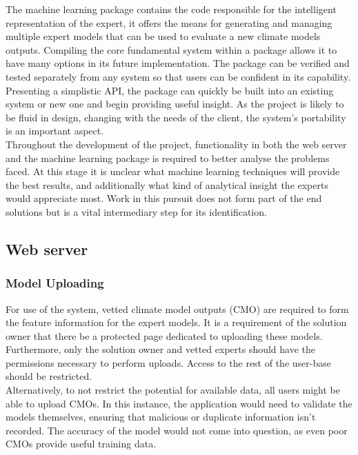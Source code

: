 \documentclass{ecmm427_assignment}
\begin{document}
\quad The machine learning package contains the code responsible for the intelligent representation of the expert, it offers the means for generating and managing multiple expert models that can be used to evaluate a new climate models outputs. Compiling the core fundamental system within a package allows it to have many options in its future implementation. The package can be verified and tested separately from any system so that users can be confident in its capability. Presenting a simplistic API, the package can quickly be built into an existing system or new one and begin providing useful insight. As the project is likely to be fluid in design, changing with the needs of the client, the system's portability is an important aspect.\\

\quad Throughout the development of the project, functionality in both the web server and the machine learning package is required to better analyse the problems faced. At this stage it is unclear what machine learning techniques will provide the best results, and additionally what kind of analytical insight the experts would appreciate most. Work in this pursuit does not form part of the end solutions but is a vital intermediary step for its identification.\\

\subsection{Web server}

\subsubsection{Model Uploading}

\quad For use of the system, vetted climate model outputs (CMO) are required to form the feature information for the expert models. It is a requirement of the solution owner that there be a protected page dedicated to uploading these models. Furthermore, only the solution owner and vetted experts should have the permissions necessary to perform uploads. Access to the rest of the user-base should be restricted.\\

\quad  Alternatively, to not restrict the potential for available data, all users might be able to upload CMOs. In this instance, the application would need to validate the models themselves, ensuring that malicious or duplicate information isn't recorded. The accuracy of the model would not come into question, as even poor CMOs provide useful training data.
\end{document}
